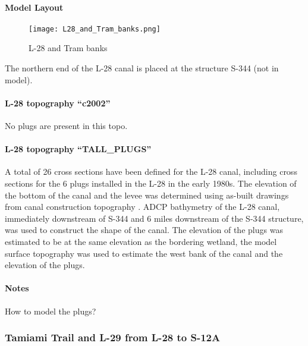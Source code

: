 \paragraph{Model Layout}

\begin{figure}[!h]
  \begin{center}
  \texttt{[image: L28\_and\_Tram\_banks.png]}
  \caption{L-28 and Tram banks}
  \end{center}
\end{figure}

The northern end of the L-28 canal is placed at the structure S-344 (not in model).

\paragraph{L-28 topography ``c2002''}
No plugs are present in this topo.

\paragraph{L-28 topography ``TALL\_PLUGS''}
A total of 26 cross sections have been defined for the L-28 canal, including cross sections for the 6 plugs installed in the L-28 in the early 1980s.  The elevation of the bottom of the canal and the levee was determined using as-built drawings from canal construction topography \citep{L28topo}.  ADCP bathymetry of the L-28 canal, immediately downstream of S-344 and 6 miles downstream of the S-344 structure, was used to construct the shape of the canal.  The elevation of the plugs was estimated to be at the same elevation as the bordering wetland, the model surface topography was used to estimate the west bank of the canal and the elevation of the plugs.

\begin{notes}
\paragraph{Notes}
How to model the plugs?
\end{notes}


\clearpage


\subsubsection{Tamiami Trail and L-29 from L-28 to S-12A}
